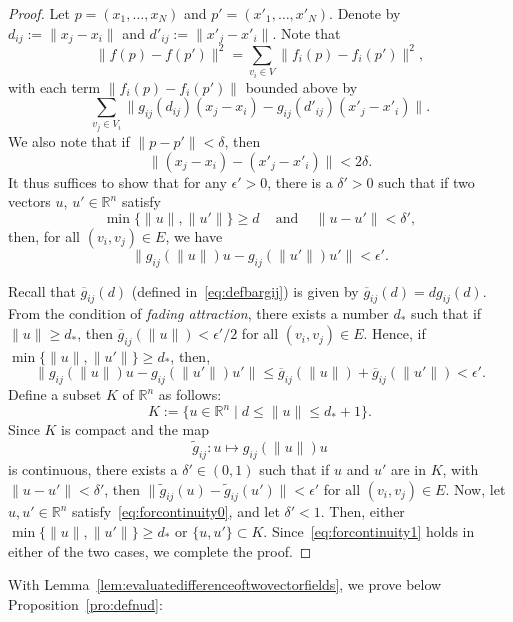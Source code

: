 \documentclass[10pt,twocolumn,twoside]{IEEEtran}
\newcommand{\R}{\mathbb{R}}
\newcommand{\ol}{\overline}
\renewcommand{\(}{\left (}
\renewcommand{\)}{\right )}
\renewcommand{\;}{\,;\,}
\begin{document}
\begin{proof}
Let 
$p = (x_1,\ldots, x_N)$ and $p' = (x'_1,\ldots, x'_N)$. Denote by
$d_{ij}:= \|x_j - x_i\|$ and  $d'_{ij}:= \|x'_j - x'_i\|$. 
Note that 
$$
\|f(p) - f(p')\|^2 = \sum_{v_i\in V}\|f_i(p) - f_i(p')\|^2, 
$$
with each term $\|f_i(p) - f_i(p')\|$ bounded above by
$$ \sum_{v_j\in V_i} \| g_{ij}(d_{ij})(x_j - x_i) - g_{ij}(d'_{ij})(x'_j - x'_i) \|.$$
We also note that if $\|p - p'\| < \delta$, then 
$$ \|(x_j - x_i) - (x'_j - x'_i) \| < 2\delta.$$ 
It thus suffices to show that for any $\epsilon' > 0$, there is a $\delta' > 0$ such that if two vectors $u$, $u'\in \R^n$ satisfy 
\begin{equation}\label{eq:forcontinuity0}
\min\{ \|u\|,  \|u'\|\} \ge d \hspace{10pt} \mbox{ and } \hspace{10pt} \|u - u'\| < \delta', 
\end{equation}
then, for all $(v_i,v_j) \in E$, we have
\begin{equation}\label{eq:forcontinuity1}
\|g_{ij}(\|u\|) u - g_{ij}(\|u'\|) u' \| < \epsilon'. 
\end{equation} 


Recall that $\ol g_{ij}(d)$ (defined in~\eqref{eq:defbargij}) is given by $\ol g_{ij}(d) = dg_{ij}(d)$. From the condition of {\it fading attraction}, there exists a number $d_*$ such that if $\|u\| \ge d_*$, then
$ \ol g_{ij}(\|u\|) < \epsilon' / 2$ for all $(v_i,v_j)\in E$.   
Hence,  if $\min\{\|u\|,  \|u'\| \}\ge d_*$, then,  
$$
\|g_{ij}(\|u\|) u - g_{ij}(\|u'\|) u' \| \le \ol g_{ij}(\|u\|) + \ol g_{ij}(\|u'\|) < \epsilon'.
$$
Define a subset $K$ of $\R^n$ as follows:
$$
K:= \{u\in \R^n \mid d \le \|u\| \le d_* + 1\}.
$$
Since $K$ is compact and the map 
$$
\widetilde g_{ij}: u\mapsto g_{ij}(\|u\|) u
$$ 
is continuous, 
there exists a $\delta'\in (0,1)$ such that if $u$ and $u'$ are in $K$, with $\|u - u'\| < \delta'$, 
then 
$
\|\widetilde g_{ij}(u) - \widetilde g_{ij}(u') \| < \epsilon'
$  for all $(v_i,v_j) \in E$. 
Now, let $u, u'\in \R^n$ satisfy~\eqref{eq:forcontinuity0}, and let $\delta' < 1$. Then, either $\min\{\|u\|, \|u'\|\} \ge d_*$ or $\{u, u' \}\subset K$. Since~\eqref{eq:forcontinuity1} holds in either of the two cases, we complete the proof. 
\end{proof}

With Lemma~\ref{lem:evaluatedifferenceoftwovectorfields}, we prove below Proposition~\ref{pro:defnud}:
\end{document}
